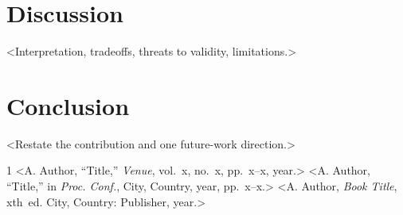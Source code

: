 \documentclass[conference]{IEEEtran}
\begin{document}
\section{Discussion}
<Interpretation, tradeoffs, threats to validity, limitations.>

\section{Conclusion}
<Restate the contribution and one future-work direction.>

\begin{thebibliography}{1}
 <A. Author, ``Title,'' \emph{Venue}, vol.~x, no.~x, pp.~x--x, year.>
 <A. Author, ``Title,'' in \emph{Proc. Conf.}, City, Country, year, pp.~x--x.>
 <A. Author, \emph{Book Title}, xth~ed. City, Country: Publisher, year.>
\end{thebibliography}
\end{document}

